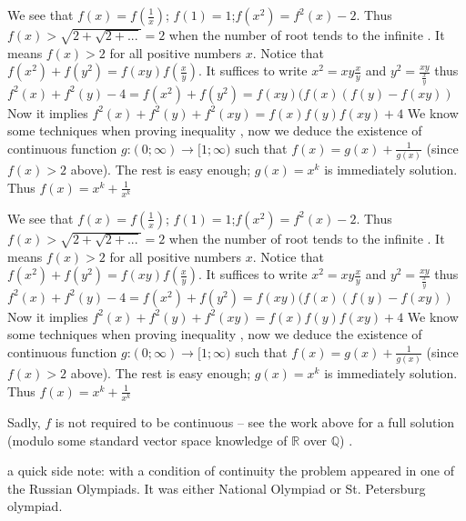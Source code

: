 \begin{solution}
	We see that $ f(x) = f(\frac {1}{x})$; $ f(1) = 1$;$ f(x^2) = f^2(x) - 2$. Thus $ f(x) > \sqrt {2 + \sqrt {2 + ...}} = 2$ when the number of root tends to the infinite . It means $ f(x) > 2$ for all positive numbers $ x$.
Notice that $ f(x^2) + f(y^2) = f(xy)f(\frac {x}{y})$. It suffices to write $ x^2 = xy\frac {x}{y}$ and $ y^2 = \frac {xy}{\frac {x}{y}}$ thus $ f^2(x) + f^2(y) - 4 = f(x^2) + f(y^2) = f(xy)(f(x)(f(y) - f(xy))$
Now it implies $ f^2(x) + f^2(y) + f^2(xy) = f(x)f(y)f(xy) + 4$
We know some techniques when proving inequality , now we deduce the existence of continuous function $ g$:$ (0;\infty )\to [1;\infty)$ such that $ f(x) = g(x) + \frac {1}{g(x)}$ (since $ f(x) > 2$ above).
The rest is easy enough; $ g(x) = x^k$ is immediately solution. Thus $ f(x) = x^k + \frac {1}{x^k}$
\end{solution}



\begin{solution}
	\begin{tcolorbox}We see that $ f(x) = f(\frac {1}{x})$; $ f(1) = 1$;$ f(x^2) = f^2(x) - 2$. Thus $ f(x) > \sqrt {2 + \sqrt {2 + ...}} = 2$ when the number of root tends to the infinite . It means $ f(x) > 2$ for all positive numbers $ x$.
Notice that $ f(x^2) + f(y^2) = f(xy)f(\frac {x}{y})$. It suffices to write $ x^2 = xy\frac {x}{y}$ and $ y^2 = \frac {xy}{\frac {x}{y}}$ thus $ f^2(x) + f^2(y) - 4 = f(x^2) + f(y^2) = f(xy)(f(x)(f(y) - f(xy))$
Now it implies $ f^2(x) + f^2(y) + f^2(xy) = f(x)f(y)f(xy) + 4$
We know some techniques when proving inequality , now we deduce the existence of continuous function $ g$:$ (0;\infty )\to [1;\infty)$ such that $ f(x) = g(x) + \frac {1}{g(x)}$ (since $ f(x) > 2$ above).
The rest is easy enough; $ g(x) = x^k$ is immediately solution. Thus $ f(x) = x^k + \frac {1}{x^k}$\end{tcolorbox}

Sadly, $ f$ is not required to be continuous -- see the work above for a full solution (modulo
some standard vector space knowledge of $ \mathbb{R}$ over $ \mathbb{Q}$) .
\end{solution}



\begin{solution}
	a quick side note: with a condition of continuity the problem appeared in one of the Russian Olympiads. It was either National Olympiad or St. Petersburg olympiad.
\end{solution}



